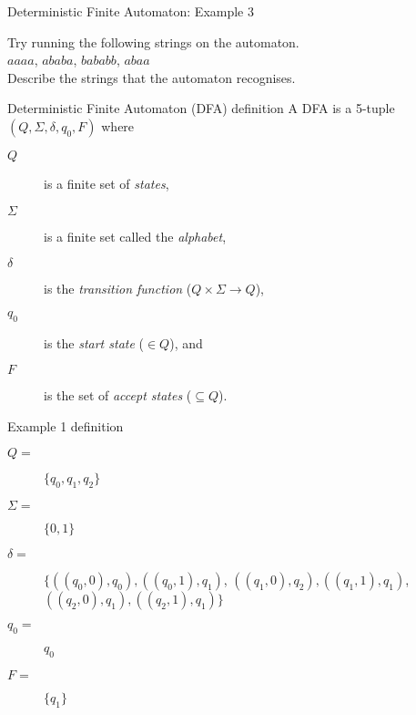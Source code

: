 \begin{frame}[fragile]{Deterministic Finite Automaton: Example 3}
  \begin{center}
  \end{center}
  \begin{center}
    Try running the following strings on the automaton. \\
    $aaaa$, $ababa$, $bababb$, $abaa$ \\
    Describe the strings that the automaton recognises.
  \end{center}
\end{frame}

\begin{frame}[fragile]{Deterministic Finite Automaton (DFA) definition}
  A DFA is a 5-tuple $(Q,\Sigma,\delta,q_0,F)$ where
  \begin{description}
    \item[$Q$] is a finite set of \emph{states},
    \item[$\Sigma$] is a finite set called the \emph{alphabet},
    \item[$\delta$] is the \emph{transition function} ($Q \times \Sigma \rightarrow Q$),
    \item[$q_0$] is the \emph{start state} ($\in Q$), and
    \item[$F$] is the set of \emph{accept states} ($\subseteq Q$). 
  \end{description}
\end{frame}

\begin{frame}[fragile]{Example 1 definition}
  \begin{description}
    \item[$Q =$] $\{ q_0, q_1, q_2\}$
    \item[$\Sigma =$] $\{ 0, 1 \}$
    \item[$\delta =$] $\{ ((q_0,0),q_0), ((q_0,1),q_1)$, $((q_1,0),q_2), ((q_1,1),q_1)$, $((q_2,0),q_1), ((q_2,1),q_1) \}$
    \item[$q_0 =$] $q_0$
    \item[$F =$] $\{ q_1 \}$
  \end{description}
\end{frame}

